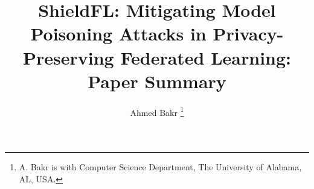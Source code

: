 \documentclass[conference]{IEEEtran}
\title{ShieldFL: Mitigating Model Poisoning Attacks in Privacy-Preserving Federated Learning: Paper Summary}
\author{Ahmed Bakr \IEEEmembership{Student Member, IEEE}
\thanks{A. Bakr is with Computer Science Department, The University of Alabama, AL, USA.}
}
\begin{document}
\maketitle


\acresetall %




 








\end{document}
